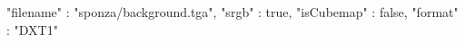 { 
	"filename" : "sponza/background.tga", 
	"srgb" : true,
	"isCubemap" : false,
	"format" : "DXT1"
}